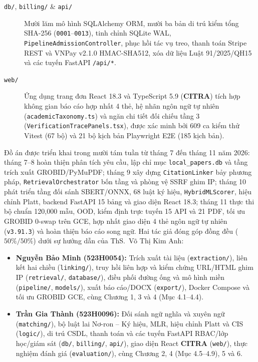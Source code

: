 \begin{description}
    \item[\texttt{db/}, \texttt{billing/} \& \texttt{api/}] Mười lăm mô hình SQLAlchemy ORM, mười ba bản di trú kiểm tổng SHA-256 (\texttt{0001}--\texttt{0013}), tinh chỉnh SQLite WAL, \texttt{PipelineAdmissionController}, phục hồi tác vụ treo, thanh toán Stripe REST và VNPay v2.1.0 HMAC-SHA512, xóa dữ liệu Luật 91/2025/QH15 và các tuyến FastAPI \texttt{/api/*}.
    \item[\texttt{web/}] Ứng dụng trang đơn React 18.3 và TypeScript 5.9 (\textbf{CITRA}) tích hợp không gian báo cáo hợp nhất 4 thẻ, hệ nhãn ngôn ngữ tự nhiên (\texttt{academic\allowbreak{}Taxonomy.ts}) và ngăn chi tiết đối chiếu tầng 3 (\texttt{Verification\allowbreak{}Trace\allowbreak{}Panels.tsx}), được xác minh bởi 609 ca kiểm thử Vitest (67 bộ) và 21 bộ kịch bản Playwright E2E (185 kịch bản).
\end{description}


Đồ án được triển khai trong mười tám tuần từ tháng 7 đến tháng 11 năm 2026: tháng 7--8 hoàn thiện phân tích yêu cầu, lập chỉ mục \texttt{local\_papers.db} và tầng trích xuất GROBID/PyMuPDF; tháng 9 xây dựng \texttt{CitationLinker} bảy phương pháp, \texttt{RetrievalOrchestrator} bốn tầng và phòng vệ SSRF ghim IP; tháng 10 phát triển tầng đối sánh SBERT/ONNX, 68 luật ký hiệu, \texttt{HybridMLScorer}, hiệu chỉnh Platt, backend FastAPI 15 bảng và giao diện React 18.3; tháng 11 thực thi bộ chuẩn 120,000 mẫu, OOD, kiểm định trực tuyến 15 API và 21 PDF, tối ưu GROBID 0-swap trên GCE, hợp nhất giao diện 4 thẻ ngôn ngữ tự nhiên (\texttt{v3.91.3}) và hoàn thiện báo cáo song ngữ. Hai tác giả đóng góp đồng đều ($50\% / 50\%$) dưới sự hướng dẫn của ThS.\ Võ Thị Kim Anh:

{\setlength{\itemsep}{2pt}
\begin{itemize}
    \item \textbf{Nguyễn Bảo Minh (523H0054):} Trích xuất tài liệu (\texttt{extraction/}), liên kết hai chiều (\texttt{linking/}), truy hồi liên hợp và kiểm chứng URL/HTML ghim IP (\texttt{retrieval/}, \texttt{database/}), điều phối đường ống và mô hình miền (\texttt{pipeline/}, \texttt{models/}), xuất báo cáo/DOCX (\texttt{export/}), Docker Compose và tối ưu GROBID GCE, cùng Chương 1, 3 và 4 (Mục 4.1--4.4).
    \item \textbf{Trần Gia Thành (523H0096):} Đối sánh ngữ nghĩa và xuyên ngữ (\texttt{matching/}), bộ luật lai Nơ-ron -- Ký hiệu, MLR, hiệu chỉnh Platt và CIS (\texttt{logic/}), di trú CSDL, thanh toán và các tuyến FastAPI RBAC/lớp học/giám sát (\texttt{db/}, \texttt{billing/}, \texttt{api/}), giao diện React \textbf{CITRA} (\texttt{web/}), thực nghiệm đánh giá (\texttt{evaluation/}), cùng Chương 2, 4 (Mục 4.5--4.9), 5 và 6.
\end{itemize}}
